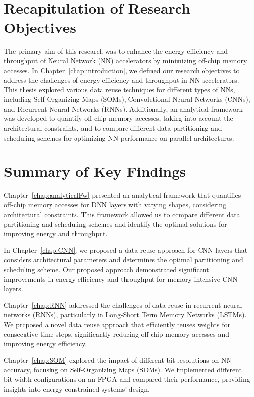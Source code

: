 \section{Recapitulation of Research Objectives}
The primary aim of this research was to enhance the energy efficiency and throughput of Neural Network (NN) accelerators by minimizing off-chip memory accesses. In Chapter~\ref{chap:introduction}, we defined our research objectives to address the challenges of energy efficiency and throughput in NN accelerators. This thesis explored various data reuse techniques for different types of NNs, including Self Organizing Maps (SOMs), Convolutional Neural Networks (CNNs), and Recurrent Neural Networks (RNNs). Additionally, an analytical framework was developed to quantify off-chip memory accesses, taking into account the architectural constraints, and to compare different data partitioning and scheduling schemes for optimizing NN performance on parallel architectures. 

\section{Summary of Key Findings}
Chapter~\ref{chap:analyticalFw} presented an analytical framework that quantifies off-chip memory accesses for DNN layers with varying shapes, considering architectural constraints. This framework allowed us to compare different data partitioning and scheduling schemes and identify the optimal solutions for improving energy and throughput.

In Chapter~\ref{chap:CNN}, we proposed a data reuse approach for CNN layers that considers architectural parameters and determines the optimal partitioning and scheduling scheme. Our proposed approach demonstrated significant improvements in energy efficiency and throughput for memory-intensive CNN layers.

Chapter~\ref{chap:RNN} addressed the challenges of data reuse in recurrent neural networks (RNNs), particularly in Long-Short Term Memory Networks (LSTMs). We proposed a novel data reuse approach that efficiently reuses weights for consecutive time steps, significantly reducing off-chip memory accesses and improving energy efficiency.

Chapter~\ref{chap:SOM} explored the impact of different bit resolutions on NN accuracy, focusing on Self-Organizing Maps (SOMs). We implemented different bit-width configurations on an FPGA and compared their performance, providing insights into energy-constrained systems' design.

